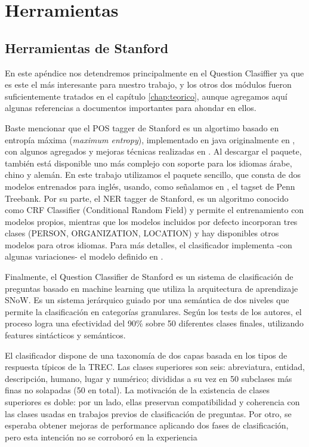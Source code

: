 \appendix
\chapter{Herramientas}
\label{chap:herramientas}

\section{Herramientas de Stanford}
\label{sec:stanford-tools}

En este apéndice nos detendremos principalmente en el Question Clasiffier ya que es este el más interesante para nuestro trabajo, y los otros dos módulos fueron suficientemente tratados en el capítulo \ref{chap:teorico}, aunque agregamos aquí algunas referencias a documentos importantes para ahondar en ellos.

Baste mencionar que el POS tagger de Stanford es un algortimo basado en entropía máxima (\textit{maximum entropy}), implementado en java originalmente en \cite{POS2}, con algunos agregados y mejoras técnicas realizadas en \cite{POS1}. Al descargar el paquete, también está disponible uno más complejo con soporte para los idiomas árabe, chino y alemán. En este trabajo utilizamos el paquete sencillo, que consta de dos modelos entrenados para inglés, usando, como señalamos en , el tagset de Penn Treebank. Por su parte, el NER tagger de Stanford, es un algoritmo conocido como CRF Classifier (Conditional Random Field) y permite el entrenamiento con modelos propios, mientras que los modelos incluidos por defecto incorporan tres clases (PERSON, ORGANIZATION, LOCATION) y hay disponibles otros modelos para otros idiomas. Para más detalles, el clasificador implementa -con algunas variaciones- el modelo definido en \cite{NER2}.

Finalmente, el Question Classifier de Stanford \cite{QC2} es un sistema de clasificación de preguntas basado en machine learning que utiliza la arquitectura de aprendizaje SNoW. Es un sistema jerárquico guiado por una semántica de dos niveles que permite la clasificación en categorías granulares. Según los tests de los autores, el proceso logra una efectividad del 90\% sobre 50 diferentes clases finales, utilizando features sintácticos y semánticos.

El clasificador dispone de una taxonomía de dos capas basada en los tipos de respuesta típicos de la TREC. Las clases superiores son seis: abreviatura, entidad, descripción, humano, lugar y numérico; divididas a su vez en 50 subclases más finas no solapadas (50 en total). La motivación de la existencia de clases superiores es doble: por un lado, ellas preservan compatibilidad y coherencia con las clases usadas en trabajos previos de clasificación de preguntas. Por otro, se esperaba obtener mejoras de performance aplicando dos fases de clasificación, pero esta intención no se corroboró en la experiencia


